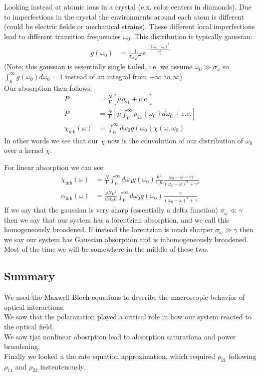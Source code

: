Looking instead at atomic ions in a crystal (e.x. color centers in diamonds). Due to imperfections in the crystal the environments around each atom is different (could be electric fields or mechanical strains).
These different local imperfections lead to different transition frequencies $\omega_0$. This distribution is typically gaussian:
\begin{align*}
	g(\omega_0) &= \frac{1}{\sigma_\omega \sqrt{\pi}} e ^{-\frac{(\omega_0 - \bar{\omega}_0)^2}{\sigma_\omega^2}}
\end{align*}
(Note: this gaussian is essentially single tailed, i.e. we assume $\bar{\omega}_0\gg\sigma_\omega$ so $\int_0^\infty g(\omega_0) d\omega_0 = 1$ instead of an integral from $-\infty$ to $\infty$) \\
Our abosrption then follows:
\begin{align*}
	P &= \frac{N}{V}\left[\mu\rho_{21} + \text{c.c.}\right] \\
	P &= \frac{N}{V}\left[\mu\int_0^\infty\rho_{21}(\omega_0)d\omega_0 + \text{c.c.}\right] \\
	\chi_\text{inh}(\omega) &= \int_0^\infty d\omega_0 g(\omega_0) \chi(\omega,\omega_0)
\end{align*}
In other words we see that our $\chi$ now is the convolution of our distribution of $\omega_0$ over a kernel $\chi$.

For linear absorption we can see:
\begin{align*}
	\chi_\text{inh}(\omega) &= \frac{N}{V} \int_0^\infty d\omega_0 g(\omega_0) \frac{\mu^2}{\epsilon_0\hbar} \frac{\omega_0 - \omega + i\gamma}{(\omega_0 - \omega)^2 + \gamma^2} \\
	\alpha_\text{inh}(\omega) &=  \frac{\omega N \mu^2}{c V \epsilon_0\hbar} \int_0^\infty d\omega_0 g(\omega_0) \frac{\gamma}{(\omega_0-\omega)^2 + \gamma}
\end{align*}
If we say that the gaussian is very sharp (essentially a delta function) $\sigma_\omega \ll \gamma$ then we say that our system has a lorentzian absorption, and we call this homogeneously broadened.
If instead the lorentzian is much sharper $\sigma_\omega \gg \gamma$ then we say our system has Gaussian absorption and is inhomogeneously broadened. Most of the time we will be somewhere in the middle of these two.
\subsection{Summary}
We used the Maxwell-Bloch equations to describe the macroscopic behavior of optical interactions.\\
We saw that the polarazation played a critical role in how our system reacted to the optical field. \\
We saw tjat nonlinear abosrption lead to absorption saturationa and power broadening. \\
Finally we looked a the rate equation approximation, which required $\rho_{21}$ following $\rho_{11}$ and $\rho_{22}$ instentenously.
